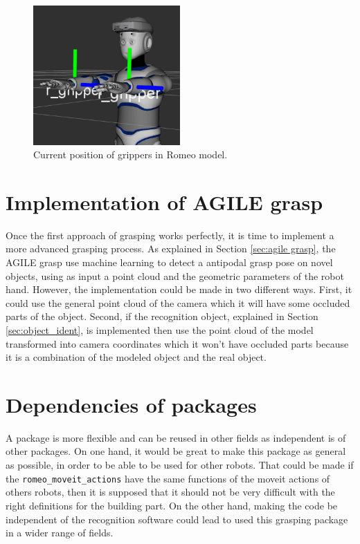 \documentclass[12pt,a4paper,final,twoside,openright]{report}
\begin{document}
\begin{figure}[h]
\centering
\includegraphics[width=0.5\textwidth]{images/gripper_bad_position.png}
\caption{Current position of grippers in Romeo model.\label{fig:gripper_bad_position}}
\end{figure}

\section{Implementation of AGILE grasp}

Once the first approach of grasping works perfectly, it is time to implement a more advanced grasping process. As explained in Section \ref{sec:agile grasp}, the AGILE grasp use machine learning to detect a antipodal grasp pose on novel objects, using as input a point cloud and the geometric parameters of the robot hand. However, the implementation could be made in two different ways. First, it could use the general point cloud of the camera which it will have some occluded parts of the object. Second, if the recognition object, explained in Section \ref{sec:object_ident}, is implemented then use the point cloud of the model transformed into camera coordinates which it won't have occluded parts because it is a combination of the modeled object and the real object. 

\section{Dependencies of packages}

A package is more flexible and can be reused in other fields as independent is of other packages. On one hand, it would be great to make this package as general as possible, in order to be able to be used for other robots. That could be made if the \texttt{romeo\_moveit\_actions} have the same functions of the moveit actions of others robots, then it is supposed that it should not be very difficult with the right definitions for the building part. On the other hand, making the code be independent of the recognition software could lead to used this grasping package in a wider range of fields.
\end{document}
